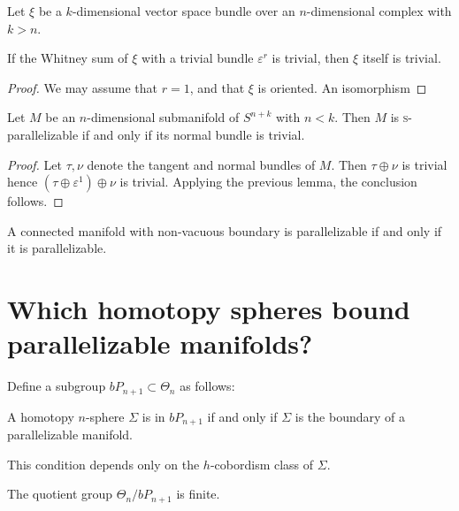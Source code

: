Let $\xi$ be a $k$-dimensional vector space bundle over an $n$-dimensional complex with $k>n$.
\begin{lemma}
If the Whitney sum of $\xi$ with a trivial bundle $\varepsilon^r$ is trivial, then $\xi$ itself is trivial.
\end{lemma}

\begin{proof}
	We may assume that $r=1$, and that $\xi$ is oriented. An isomorphism 
\end{proof}

\begin{lemma}
	Let $M$ be an $n$-dimensional submanifold of $S^{n+k}$ with $n<k$. Then $M$ is \textsc{s}-parallelizable if and only if its normal bundle is trivial.
\end{lemma}

\begin{proof}
	Let $\tau, \nu$ denote the tangent and normal bundles of $M$. Then $\tau\oplus \nu$ is trivial hence $(\tau\oplus \varepsilon^1)\oplus \nu$ is trivial. Applying the previous lemma, the conclusion follows.
\end{proof}

\begin{lemma}
	A connected manifold with non-vacuous boundary is parallelizable if and only if it is parallelizable.
\end{lemma}

\section{Which homotopy spheres bound parallelizable manifolds?}

Define a subgroup $bP_{n+1} \subset \Theta_n$ as follows:

A homotopy $n$-sphere $\Sigma$ is in $bP_{n+1}$ if and only if $\Sigma$ is the boundary of a parallelizable manifold.

\begin{claim}
	This condition depends only on the $h$-cobordism class of $\Sigma$.
\end{claim}

\begin{theorem}
	The quotient group $\Theta_n / bP_{n+1}$ is finite.
\end{theorem}

